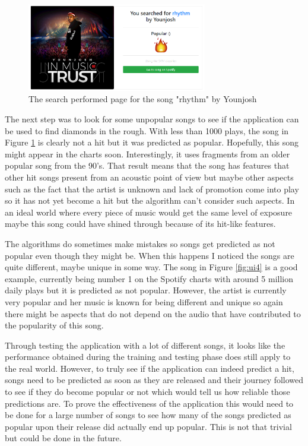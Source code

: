 \begin{figure}[h]
\centering
\includegraphics[width=0.7\textwidth]{web_application/fig/ui3.PNG} %
\caption{The search performed page for the song "rhythm" by Younjosh}
\label{fig:ui3}
\end{figure}

The next step was to look for some unpopular songs to see if the application can be used to find diamonds in the rough. With less than 1000 plays, the song in Figure \ref{fig:ui3} is clearly not a hit but it was predicted as popular. Hopefully, this song might appear in the charts soon. Interestingly, it uses fragments from an older popular song from the 90's. That result means that the song has features that other hit songs present from an acoustic point of view but maybe other aspects such as the fact that the artist is unknown and lack of promotion come into play so it has not yet become a hit but the algorithm can't consider such aspects. In an ideal world where every piece of music would get the same level of exposure maybe this song could have shined through because of its hit-like features.

The algorithms do sometimes make mistakes so songs get predicted as not popular even though they might be. When this happens I noticed the songs are quite different, maybe unique in some way. The song in Figure \ref{fig:ui4} is a good example, currently being number 1 on the Spotify charts with around 5 million daily plays but it is predicted as not popular. However, the artist is currently very popular and her music is known for being different and unique so again there might be aspects that do not depend on the audio that have contributed to the popularity of this song.

Through testing the application with a lot of different songs, it looks like the performance obtained during the training and testing phase does still apply to the real world. However, to truly see if the application can indeed predict a hit, songs need to be predicted as soon as they are released and their journey followed to see if they do become popular or not which would tell us how reliable those predictions are. To prove the effectiveness of the application this would need to be done for a large number of songs to see how many of the songs predicted as popular upon their release did actually end up popular. This is not that trivial but could be done in the future.



